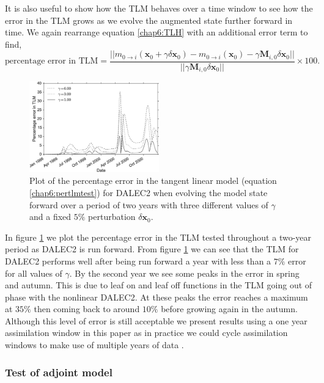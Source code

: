 It is also useful to show how the TLM behaves over a time window to see how the error in the TLM grows as we evolve the augmented state further forward in time. We again rearrange equation \eqref{chap6:TLH} with an additional error term to find, 
\begin{equation}
\text{percentage error in TLM} =  \frac{||m_{0\rightarrow i}(\mathbf{x}_0+\gamma \delta\mathbf{x}_0) - m_{0 \rightarrow i}(\mathbf{x}_0) - \gamma\mathbf{M}_{i,0}  \delta\mathbf{x}_0||}{|| \gamma\mathbf{M}_{i,0}  \delta\mathbf{x}_0||} \times 100. \label{chap6:pertlmtest}
\end{equation}

\begin{figure}[ht]
    \centering
    \includegraphics[width=0.5\textwidth]{chapter/chapter6/percenterrlinmod.eps}
    \caption{Plot of the percentage error in the tangent linear model (equation \eqref{chap6:pertlmtest}) for DALEC2 when evolving the model state forward over a period of two years with three different values of $\gamma$ and a fixed $5\%$ perturbation $\delta \textbf{x}_0$.}
    \label{chap6:fig:tlm_error}
\end{figure}

In figure \ref{chap6:fig:tlm_error} we plot the percentage error in the TLM tested throughout a two-year period as DALEC2 is run forward. From figure \ref{chap6:fig:tlm_error} we can see that the TLM for DALEC2 performs well after being run forward a year with less than a $7\%$ error for all values of $\gamma$. By the second year we see some peaks in the error in spring and autumn. This is due to leaf on and leaf off functions in the TLM going out of phase with the nonlinear DALEC2. At these peaks the error reaches a maximum at $35\%$ then coming back to around $10\%$ before growing again in the autumn. Although this level of error is still acceptable we present results using a one year assimilation window in this paper as in practice we could cycle assimilation windows to make use of multiple years of data \citep{moodycycled4dvar}.

\subsubsection{Test of adjoint model} 

